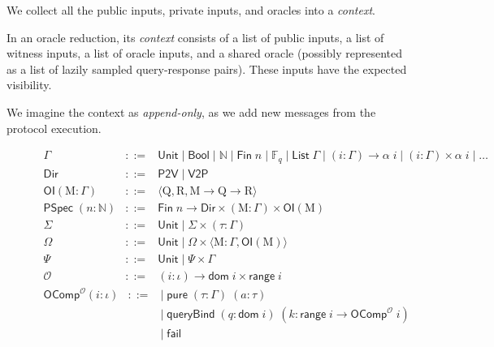 We collect all the public inputs, private inputs, and oracles into a \emph{context}.

\begin{definition}[Context]\label{def:context}
    In an oracle reduction, its \emph{context} consists of a list of public inputs, a list of witness inputs, a list of oracle inputs, and a shared oracle (possibly represented as a list of lazily sampled query-response pairs). These inputs have the expected visibility.
\end{definition}

We imagine the context as \emph{append-only}, as we add new messages from the protocol execution.

\begin{figure}[t]
    \[\begin{array}{rcl}
        \Gamma &::=& \mathsf{Unit} \mid \mathsf{Bool} \mid \mathbb{N} \mid \mathsf{Fin}\; n \mid \mathbb{F}_q \mid \mathsf{List}\;\Gamma \mid (i : \Gamma) \to \alpha\; i \mid (i : \Gamma) \times \alpha\; i \mid \dots \\[1em]
        \mathsf{Dir} &::=& \mathsf{P2V} \mid \mathsf{V2P} \\ 
        \mathsf{OI} (\mathrm{M} : \Gamma) &::=& \langle \mathrm{Q}, \mathrm{R}, \mathrm{M} \to \mathrm{Q} \to \mathrm{R} \rangle \\
        \mathsf{PSpec}\; (n : \mathbb{N}) &::=& \mathsf{Fin}\; n \to \mathsf{Dir} \times (\mathrm{M} : \Gamma) \times \mathsf{OI}(\mathrm{M}) \\[1em]
        \varSigma &::=& \mathsf{Unit} \mid \varSigma \times (\tau : \Gamma) \\
        \Omega &::=& \mathsf{Unit} \mid \Omega \times \langle \mathrm{M} : \Gamma, \mathsf{OI}(\mathrm{M}) \rangle \\
        \Psi &::=& \mathsf{Unit} \mid \Psi \times \Gamma\\
        \mathcal{O} &::=& (i : \iota) \to \mathsf{dom}\; i \times \mathsf{range}\; i
    \end{array}\]
    \[\begin{array}{rcl}
        \mathsf{OComp}^{\mathcal{O}} (i : \iota) &::=& \mid\; \mathsf{pure}\; (\tau : \Gamma)\; (a : \tau) \\
        && \mid\; \mathsf{queryBind}\; (q : \mathsf{dom}\; i)\; (k : \mathsf{range}\; i \to \mathsf{OComp}^{\mathcal{O}}\; i) \\
        && \mid\; \mathsf{fail} \\[1em]

\end{array}\]
\end{figure}
